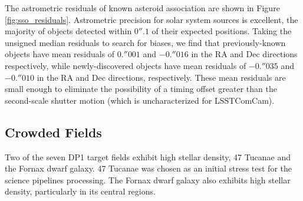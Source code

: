 The astrometric residuals of known asteroid association are shown in Figure \ref{fig:sso_residuals}.
Astrometric precision for solar system sources is excellent, the majority of objects detected within $0''.1$ of their expected positions.
Taking the unsigned median residuals to search for biases, we find that previously-known objects have mean residuals of $0.''001$ and $-0.''016$ in the \gls{RA} and Dec directions respectively, while newly-discovered objects have mean residuals of $-0.''035$ and $-0.''010$ in the \gls{RA} and Dec directions, respectively.
These mean residuals are small enough to eliminate the possibility of a timing offset greater than the second-scale shutter motion (which is uncharacterized for LSSTComCam).

\subsection{Crowded Fields}
Two of the seven \gls{DP1} target fields exhibit high stellar density, 47 Tucanae and the Fornax dwarf galaxy.
47 Tucanae was chosen as an initial stress test for the science pipelines processing.
The Fornax dwarf galaxy also exhibits high stellar density, particularly in its central regions.
